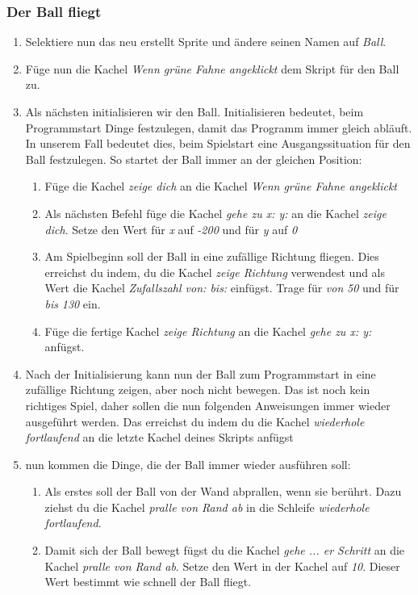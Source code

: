 \subsubsection{Der Ball fliegt}
\begin{enumerate}
\item Selektiere nun das neu erstellt Sprite und ändere seinen Namen auf \emph{Ball}.
\item Füge nun die Kachel \textit{Wenn grüne Fahne angeklickt} dem Skript für den Ball zu.
\item Als nächsten initialisieren wir den Ball. 
Initialisieren bedeutet, beim Programmstart Dinge festzulegen, damit das Programm immer gleich abläuft. In unserem Fall bedeutet dies, beim Spielstart eine Ausgangssituation für den Ball festzulegen. So startet der Ball immer an der gleichen Position:
\begin{enumerate}
\item Füge die Kachel \textit{zeige dich} an die Kachel \textit{Wenn grüne Fahne angeklickt}
\item Als nächsten Befehl füge die Kachel \textit{gehe zu x: y:} an die Kachel \textit{zeige dich}. Setze den Wert für \emph{x} auf \emph{-200} und für \emph{y} auf \emph{0}
\item Am Spielbeginn soll der Ball in eine zufällige Richtung fliegen. Dies erreichst du indem, du die Kachel \textit{zeige Richtung} verwendest und als Wert die Kachel \textit{Zufallszahl von: bis:} einfügst. Trage für \emph{von} \emph{50} und für \emph{bis} \emph{130} ein.
\item Füge die fertige Kachel \textit{zeige Richtung} an die Kachel  \textit{gehe zu x: y:}  anfügst.
\end{enumerate}
\item Nach der Initialisierung kann nun der Ball zum Programmstart in eine zufällige Richtung zeigen, aber noch nicht bewegen. Das ist noch kein richtiges Spiel, daher sollen die nun folgenden Anweisungen immer wieder ausgeführt werden. Das erreichst du indem du die Kachel \textit{wiederhole fortlaufend} an die letzte Kachel deines Skripts anfügst 
\item nun kommen die Dinge, die der Ball immer wieder ausführen soll:
\begin{enumerate}
\item Als erstes soll der Ball von der Wand abprallen, wenn sie berührt. Dazu ziehst du die Kachel \textit{pralle von Rand ab} in die Schleife \textit{wiederhole fortlaufend}. 
\item Damit sich der Ball bewegt fügst du die Kachel \textit{gehe ... er Schritt} an die Kachel \textit{pralle von Rand ab}. Setze den Wert in der Kachel auf \emph{10}. Dieser Wert bestimmt wie schnell der Ball fliegt.  

\end{enumerate}
\end{enumerate}
